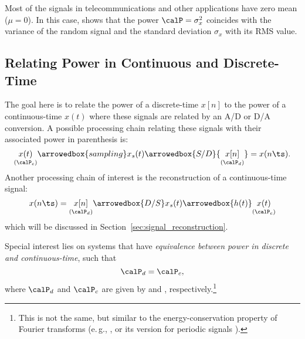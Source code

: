 
Most of the signals in telecommunications and other applications have zero mean ($\mu = 0$). In this case,  shows that the power $\calP = \sigma_x^2$ coincides with the variance of the random signal and the standard deviation $\sigma_x$ with its RMS value. %

\subsection{{\akadvanced} Relating Power in Continuous and Discrete-Time}
\label{sec:cont_disc_power}

The goal here is to relate the power of a discrete-time $x[n]$ to the power of a continuous-time $x(t)$ where these signals are related by an A/D or D/A conversion. A possible processing chain relating these signals with their associated power in parenthesis is:
\begin{equation}
{\underset{({\calP}_c)}{x(t)}} \arrowedbox{sampling} x_s(t) \arrowedbox{S/D} {\underset{({\calP}_d)}{x[n]}}  = x(n\ts).
\label{eq:powersFromCtoD}
\end{equation}
Another processing chain of interest is the reconstruction of a continuous-time signal:
\begin{equation}
x(n\ts) = \underset{(\calP_d)}{x[n]} \arrowedbox{D/S} x_s(t) \arrowedbox{h(t)} \underset{(\calP_c)}{x(t)}
\label{eq:powersFromDtoC}
\end{equation}
which will be discussed in Section~\ref{sec:signal_reconstruction}.

Special interest lies on systems that have \emph{equivalence between power in discrete and continuous-time}, such that
\begin{equation}
\calP_d=\calP_c,
\label{eq:energyConservationContinuousDiscreteTime}
\end{equation}
where $\calP_d$ and $\calP_c$ are given by  and , respectively.\footnote{This is not the same, but similar to the energy-conservation property of Fourier transforms (e.\,g., , or its version for periodic signals ).}

